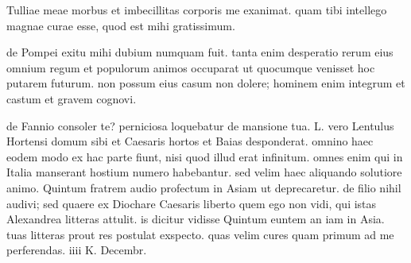  Tulliae meae morbus et imbecillitas corporis me exanimat. quam tibi intellego magnae curae esse, quod est mihi gratissimum.

 de Pompei exitu mihi dubium numquam fuit. tanta enim desperatio rerum eius omnium regum et populorum animos occuparat ut quocumque venisset hoc putarem futurum. non possum eius casum non dolere; hominem enim integrum et castum et gravem cognovi.

 de Fannio consoler te? perniciosa loquebatur de mansione tua. L. vero Lentulus Hortensi domum sibi et Caesaris hortos et Baias desponderat. omnino haec eodem modo ex hac parte fiunt, nisi quod illud erat infinitum. omnes enim qui in Italia manserant hostium numero habebantur. sed velim haec aliquando solutiore animo. Quintum fratrem audio profectum in Asiam ut deprecaretur. de filio nihil audivi; sed quaere ex Diochare Caesaris liberto quem ego non vidi, qui istas Alexandrea litteras attulit. is dicitur vidisse Quintum euntem an iam in Asia. tuas litteras prout res postulat exspecto. quas velim cures quam primum ad me perferendas. iiii K. Decembr.
